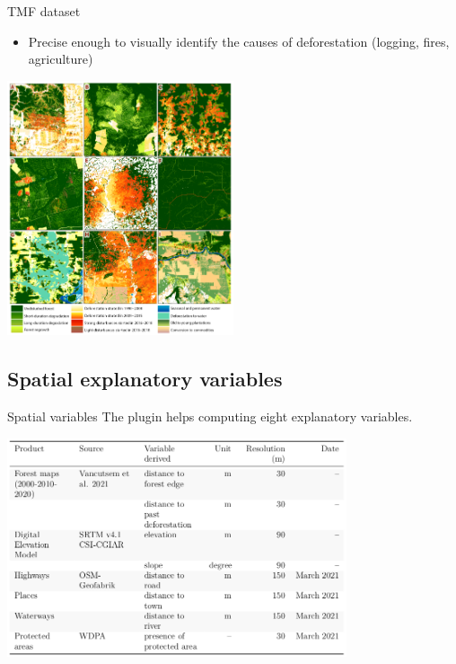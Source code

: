 \documentclass[10pt,table,dvipsnames,compress]{beamer}
\begin{document}
\begin{frame}[label={sec:orgd0bbec4}]{TMF dataset}
\begin{itemize}
\item Precise enough to visually identify the causes of deforestation
(logging, fires, agriculture)
\end{itemize}

\begin{center}
\includegraphics[width=0.5\textwidth]{figs/Vancutsem2021-patterns.png}
\end{center}
\end{frame}

\subsection{Spatial explanatory variables}
\label{sec:org3a75228}

\begin{frame}[label={sec:org8b6e56b}]{Spatial variables}
The plugin helps computing eight explanatory variables.

\begin{center}
\includegraphics[width=0.75\textwidth]{figs/variables-tab.png}
\end{center}
\end{frame}
\end{document}

